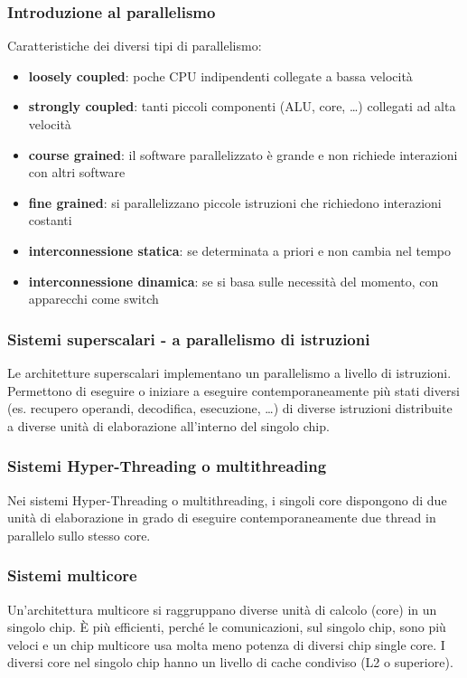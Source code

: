 \documentclass[a4paper]{article}
\begin{document}
\subsubsection*{Introduzione al parallelismo}
Caratteristiche dei diversi tipi di parallelismo:
\begin{itemize}
	\item \textbf{loosely coupled}: poche CPU indipendenti collegate a bassa velocità
	\item \textbf{strongly coupled}: tanti piccoli componenti (ALU, core, \dots) collegati ad alta velocità
	\item \textbf{course grained}: il software parallelizzato è grande e non richiede interazioni con altri software
	\item \textbf{fine grained}: si parallelizzano piccole istruzioni che richiedono interazioni costanti
	\item \textbf{interconnessione statica}: se determinata a priori e non cambia nel tempo
	\item \textbf{interconnessione dinamica}: se si basa sulle necessità del momento, con apparecchi come switch
\end{itemize}

\subsubsection*{Sistemi superscalari - a parallelismo di istruzioni}
Le architetture superscalari implementano un parallelismo a livello di istruzioni. Permettono di eseguire o iniziare a eseguire
contemporaneamente più stati diversi (es. recupero operandi, decodifica, esecuzione, \dots) di diverse istruzioni distribuite a
diverse unità di elaborazione all'interno del singolo chip.

\subsubsection*{Sistemi Hyper-Threading o multithreading}
Nei sistemi Hyper-Threading o multithreading, i singoli core dispongono di due unità di elaborazione in grado di eseguire
contemporaneamente due thread in parallelo sullo stesso core.

\subsubsection*{Sistemi multicore}
Un'architettura multicore si raggruppano diverse unità di calcolo (core) in un singolo chip. È più efficienti, perché le
comunicazioni, sul singolo chip, sono più veloci e un chip multicore usa molta meno potenza di diversi chip single core.
I diversi core nel singolo chip hanno un livello di cache condiviso (L2 o superiore).
\end{document}
